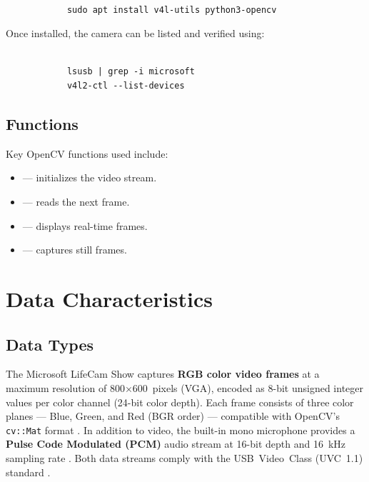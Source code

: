 \begin{tcolorbox}[colback=white,colframe=black,coltext= ShellColor, sharp corners, boxrule=0.8pt]
	\begin{small}
		\begin{verbatim}
			
			sudo apt install v4l-utils python3-opencv	\end{verbatim}
	\end{small}
\end{tcolorbox}


Once installed, the camera can be listed and verified using:


\begin{tcolorbox}[colback=white,colframe=black,coltext= ShellColor, sharp corners, boxrule=0.8pt]
	\begin{small}
		\begin{verbatim}
			
			lsusb | grep -i microsoft
			v4l2-ctl --list-devices	\end{verbatim}
	\end{small}
\end{tcolorbox}

\subsection{Functions}
Key OpenCV functions used include:
\begin{itemize}
	\item {} — initializes the video stream.
	\item {} — reads the next frame.
	\item {} — displays real-time frames.
	\item {} — captures still frames.
\end{itemize}

\newpage
\section{Data Characteristics}
\label{sec:lifecam_data}

\subsection{Data Types}
The Microsoft LifeCam Show captures \textbf{RGB color video frames} at a maximum resolution of 800$\times$600~pixels (VGA), encoded as 8-bit unsigned integer values per color channel (24-bit color depth).  
Each frame consists of three color planes — Blue, Green, and Red (BGR order) — compatible with OpenCV’s \texttt{cv::Mat} format \cite{opencv_doc_2024}.  
In addition to video, the built-in mono microphone provides a \textbf{Pulse Code Modulated (PCM)} audio stream at 16-bit depth and 16~kHz sampling rate \cite{microsoft_lifecam_datasheet}.  
Both data streams comply with the \ac{USB}~Video~Class (UVC~1.1) standard \cite{linux_uvc_driver}.


